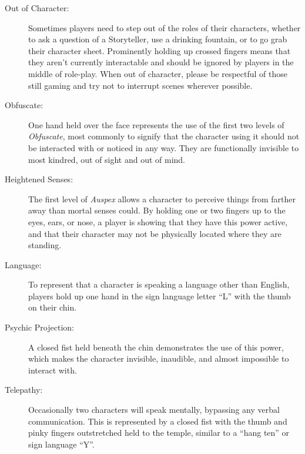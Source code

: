 \begin{description}
	\item[Out of Character:] Sometimes players need to step out of the roles of their characters, whether 
	to ask a question of a Storyteller, use a drinking fountain, or to go grab their character sheet.  
	Prominently holding up crossed fingers means that they aren't currently interactable and should be 
	ignored by players in the middle of role-play.  When out of character, please be respectful of those 
	still gaming and try not to interrupt scenes wherever possible.
	\item[Obfuscate:] One hand held over the face represents the use of the first two levels of 
	\emph{Obfuscate}, most commonly to signify that the character using it should not be interacted with or 
	noticed in any way.  They are functionally invisible to most kindred, out of sight and out of mind.
	\item[Heightened Senses:] The first level of \emph{Auspex} allows a character to perceive things 
	from farther away than mortal senses could. By holding one or two fingers up to the eyes, ears, or nose, 
	a player is showing that they have this power active, and that their character may not be physically 
	located where they are standing.
	\item[Language:] To represent that a character is speaking a language other than English, players 
	hold up one hand in the sign language letter ``L'' with the thumb on their chin.
	\item[Psychic Projection:] A closed fist held beneath the chin demonstrates the use of this power, 
	which makes the character invisible, inaudible, and almost impossible to interact with.
	\item[Telepathy:] Occasionally two characters will speak mentally, bypassing any verbal communication. 
	This is represented by a closed fist with the thumb and pinky fingers outstretched held to the temple, 
	similar to a ``hang ten'' or sign language ``Y''.
\end{description}
